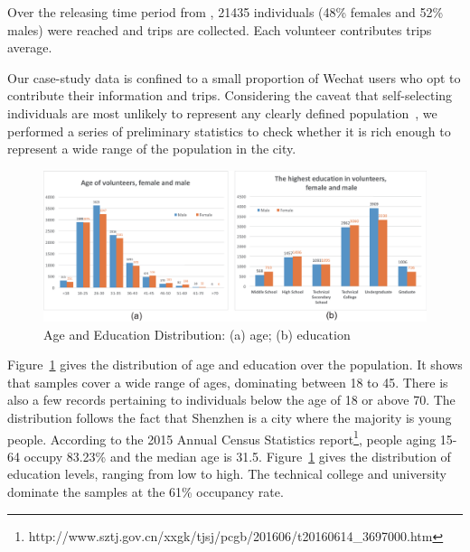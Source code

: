 Over the releasing time period from , 21435 individuals (48\% females and 52\% males) were reached and  trips are collected. Each volunteer contributes  trips average.

Our case-study data is confined to a small proportion of Wechat users who opt to contribute their information and trips.
Considering the caveat that self-selecting individuals are most unlikely to represent any clearly defined population~\citep{Longley2015}, we performed a series of preliminary statistics to check whether it is rich enough to represent a wide range of the population in the city.

\begin{figure}[htb!]
 \centering %
 \includegraphics[width=\columnwidth]{pictures/data1}
 \caption{Age and Education Distribution: (a) age; (b) education}
 \label{fig:data_age_edu}
\end{figure}

Figure~\ref{fig:data_age_edu} gives the distribution of age and education over the population. It shows that samples cover a wide range of ages, dominating between 18 to 45. There is also a few records pertaining to individuals below the age of 18 or above 70. The distribution follows the fact that Shenzhen is a city where the majority is young people. According to the 2015 Annual Census Statistics report\footnote{http://www.sztj.gov.cn/xxgk/tjsj/pcgb/201606/t20160614\_3697000.htm}, people aging 15-64 occupy 83.23\% and the median age is 31.5. Figure~\ref{fig:data_age_edu} gives the distribution of education levels, ranging from low to high. The technical college and university dominate the samples at the 61\% occupancy rate.

